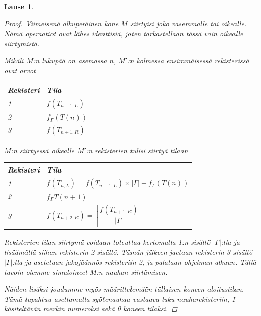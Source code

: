 \documentclass[a4paper, 12pt]{article}
\theoremstyle{definition}
\theoremstyle{plain}
\newtheorem{teor}[mydef]{Lause}
\begin{document}
\begin{teor}
\begin{proof}
Viimeisenä alkuperäinen kone $M$ siirtyisi joko vasemmalle tai oikealle. Nämä operaatiot ovat lähes identtisiä, joten tarkastellaan tässä vain oikealle siirtymistä.

Mikäli $M$:n lukupää on asemassa $n$, $M'$:n kolmessa ensimmäisessä rekisterissä ovat arvot 
\begin{center}
\begin{tabular}{l l}
Rekisteri & Tila \\
\hline
1 & $f(T_{n-1, L})$ \\
2 & $f_{\Gamma}(T(n))$ \\
3 & $f(T_{n+1, R})$ \\
\end{tabular}
\end{center}
$M$:n siirtyessä oikealle $M'$:n rekisterien tulisi siirtyä tilaan
\begin{center}
\begin{tabular}{l l}
Rekisteri & Tila \\
\hline
1 & $f(T_{n, L}) = f(T_{n-1, L}) \times |\Gamma| + f_{\Gamma}(T(n))$ \\
2 & $f_{\Gamma}T(n+1)$ \\
3 & $f(T_{n+2, R}) = \left\lfloor\dfrac{f(T_{n+1, R})}{|\Gamma|}\right\rfloor$ \\
\end{tabular}

\end{center}
Rekisterien tilan siirtymä voidaan toteuttaa kertomalla 1:n sisältö $|\Gamma|$:lla ja lisäämällä siihen rekisterin 2 sisältö. Tämän jälkeen jaetaan rekisterin 3 sisältö $|\Gamma|$:lla ja asetetaan jakojäännös rekisteriin 2, ja palataan ohjelman alkuun. Tällä tavoin olemme simuloineet $M$:n nauhan siirtämisen.
\qedhere


Näiden lisäksi joudumme myös määrittelemään tällaisen koneen aloitustilan. Tämä tapahtuu asettamalla syötenauhaa vastaava luku nauharekisteriin, 1 käsiteltävän merkin numeroksi sekä 0 koneen tilaksi.

\qedhere
\end{proof}
\end{teor}
\end{document}
